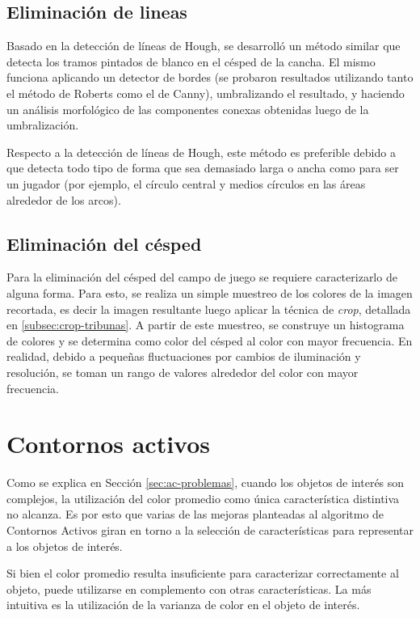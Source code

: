 
\subsection{Eliminación de lineas}

Basado en la detección de líneas de Hough, se desarrolló un método similar que
detecta los tramos pintados de blanco en el césped de la cancha. El mismo
funciona aplicando un detector de bordes (se probaron resultados utilizando
tanto el método de Roberts como el de Canny), umbralizando el resultado, y
haciendo un análisis morfológico de las componentes conexas obtenidas luego de
la umbralización.

Respecto a la detección de líneas de Hough, este método es preferible debido
a que detecta todo tipo de forma que sea demasiado larga o ancha como para
ser un jugador (por ejemplo, el círculo central y medios círculos en las
áreas alrededor de los arcos).

\subsection{Eliminación del césped}

Para la eliminación del césped del campo de juego se requiere caracterizarlo
de alguna forma. Para esto, se realiza un simple muestreo de los colores de
la imagen recortada, es decir la imagen resultante luego aplicar la técnica
de \textit{crop}, detallada en \ref{subsec:crop-tribunas}. A partir de este
muestreo, se construye un histograma de colores y se determina como color del
césped al color con mayor frecuencia. En realidad, debido a pequeñas
fluctuaciones por cambios de iluminación y resolución, se toman un rango de
valores alrededor del color con mayor frecuencia.

\section{Contornos activos}
\label{sec:ac-extension}

Como se explica en Sección \ref{sec:ac-problemas}, cuando los objetos de
interés son complejos, la utilización del color promedio como única
característica distintiva no alcanza. Es por esto que varias de las mejoras
planteadas al algoritmo de Contornos Activos giran en torno a la selección de
características para representar a los objetos de interés.


Si bien el color promedio resulta insuficiente para caracterizar correctamente
al objeto, puede utilizarse en complemento con otras características. La más
intuitiva es la utilización de la varianza de color en el objeto de interés.



